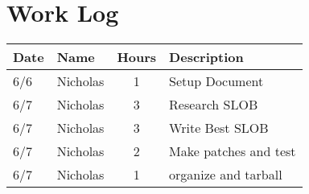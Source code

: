 \documentclass[letterpaper,10pt,fleqn,draftclsnofoot,onecolumn]{IEEEtran}
\begin{document}
	\section*{Work Log}
	\begin{tabular}{l l c p{1.1in}}\textbf{Date} & \textbf{Name} & \textbf{Hours} & \textbf{Description}\\\hline
		6/6 & Nicholas & 1 & Setup Document\\\hline
		6/7 & Nicholas & 3 & Research SLOB\\\hline
		6/7 & Nicholas & 3 & Write Best SLOB\\\hline
		6/7 & Nicholas & 2 & Make patches and test\\\hline
		6/7 & Nicholas & 1 & organize and tarball\\\hline



	\end{tabular}
		\nocite{*}
		
		
	
\end{document}
